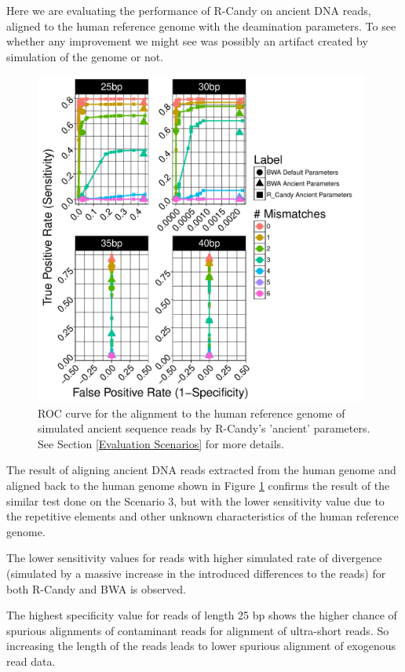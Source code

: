 \documentclass[11pt,a4paper]{report}
\begin{document}
Here we are evaluating the performance of R-Candy on ancient DNA reads, 
aligned to the human reference genome with the deamination parameters.
To see whether any improvement we might see was possibly an artifact
created by simulation of the genome or not.


\begin{figure}[H]
\centering
\includegraphics[width=11cm]{pictures/f_DS4_emp.pdf}

\caption{
ROC curve for the alignment to the human reference genome of simulated ancient
sequence reads by R-Candy's 'ancient' parameters. See Section \ref{Evaluation 
Scenarios} for more details. }

\label{DS4_emp}
\end{figure}



The result of aligning ancient DNA reads extracted from the human genome and 
aligned back to the human genome shown in Figure \ref{DS4_emp} confirms the result of 
the similar test done on the Scenario 3, but with the lower sensitivity value 
due to the repetitive elements and other unknown characteristics of the human 
reference genome.

The lower sensitivity values for reads with higher simulated rate of divergence 
(simulated by a massive increase in the introduced differences to the reads) for
both R-Candy and BWA is observed.

The highest specificity value for reads of length 25 bp shows the higher chance
of spurious alignments of contaminant reads for alignment of ultra-short reads.
So increasing the length of the reads leads to lower spurious alignment of 
exogenous read data.
\end{document}
